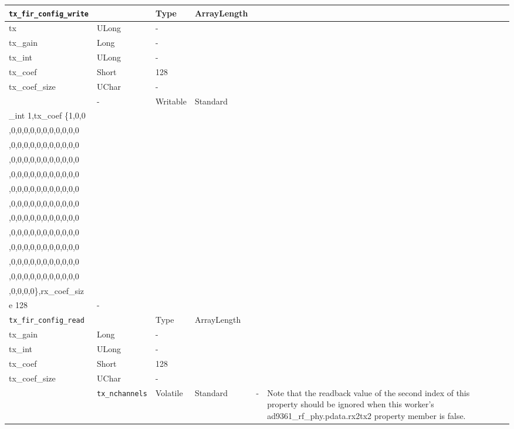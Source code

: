 \documentclass{article}
\begin{document}
\begin{landscape}
\begin{scriptsize}
\begin{longtable}{|p{3.6cm}|p{8.1cm}|p{1.4cm}|p{1.3cm}|p{1.4cm}|p{2.5cm}|p{3.6cm}|}
			\verb+tx_fir_config_write+ & \begin{tabular}{|p{2.2cm}|p{2.7cm}|p{1.7cm}|} \hline \cellcolor{blue} Name & \cellcolor{blue}Type & \cellcolor{blue} ArrayLength \\ \hline tx & ULong & - \\ \hline tx\_gain & Long & - \\ \hline tx\_int & ULong & - \\ \hline tx\_coef & Short & 128 \\ \hline tx\_coef\_size & UChar & - \\ \hline\end{tabular} & - & Writable & Standard & \begin{tabular}{l}tx 0x03,tx\_gain 0,tx\\\_int 1,tx\_coef \{1,0,0\\,0,0,0,0,0,0,0,0,0,0,0\\,0,0,0,0,0,0,0,0,0,0,0\\,0,0,0,0,0,0,0,0,0,0,0\\,0,0,0,0,0,0,0,0,0,0,0\\,0,0,0,0,0,0,0,0,0,0,0\\,0,0,0,0,0,0,0,0,0,0,0\\,0,0,0,0,0,0,0,0,0,0,0\\,0,0,0,0,0,0,0,0,0,0,0\\,0,0,0,0,0,0,0,0,0,0,0\\,0,0,0,0,0,0,0,0,0,0,0\\,0,0,0,0,0,0,0,0,0,0,0\\,0,0,0,0\},rx\_coef\_siz\\e 128\end{tabular} & - \\
			\hline
			\verb+tx_fir_config_read+ & \begin{tabular}{|p{2.2cm}|p{2.7cm}|p{1.7cm}|} \hline \cellcolor{blue} Name & \cellcolor{blue}Type & \cellcolor{blue}ArrayLength \\ \hline tx\_gain & Long & -\\ \hline tx\_int & ULong & -\\ \hline tx\_coef & Short & 128 \\ \hline tx\_coef\_size & UChar & - \\ \hline \end{tabular} & \verb+tx_nchannels+ & Volatile & Standard & - & Note that the readback value of the second index of this property should be ignored when this worker's ad9361\_rf\_phy.pdata.rx2tx2 property member is false. \\

\end{longtable}
\end{scriptsize}
\end{landscape}
\end{document}
